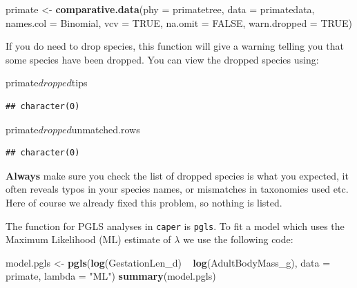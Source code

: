 \documentclass[]{book}
\newenvironment{Shaded}{\begin{snugshade}}{\end{snugshade}}
\newcommand{\KeywordTok}[1]{\textcolor[rgb]{0.13,0.29,0.53}{\textbf{{#1}}}}
\newcommand{\DataTypeTok}[1]{\textcolor[rgb]{0.13,0.29,0.53}{{#1}}}
\newcommand{\StringTok}[1]{\textcolor[rgb]{0.31,0.60,0.02}{{#1}}}
\newcommand{\OtherTok}[1]{\textcolor[rgb]{0.56,0.35,0.01}{{#1}}}
\newcommand{\NormalTok}[1]{{#1}}
\theoremstyle{definition}
\theoremstyle{definition}
\theoremstyle{definition}
\theoremstyle{remark}
\begin{document}
\begin{Shaded}
\begin{Highlighting}[]
\NormalTok{primate <-}\StringTok{ }\KeywordTok{comparative.data}\NormalTok{(}\DataTypeTok{phy =} \NormalTok{primatetree, }\DataTypeTok{data =} \NormalTok{primatedata, }
                            \DataTypeTok{names.col =} \NormalTok{Binomial, }\DataTypeTok{vcv =} \OtherTok{TRUE}\NormalTok{, }
                            \DataTypeTok{na.omit =} \OtherTok{FALSE}\NormalTok{, }\DataTypeTok{warn.dropped =} \OtherTok{TRUE}\NormalTok{)}
\end{Highlighting}
\end{Shaded}

If you do need to drop species, this function will give a warning
telling you that some species have been dropped. You can view the
dropped species using:

\begin{Shaded}
\begin{Highlighting}[]
\NormalTok{primate$dropped$tips}
\end{Highlighting}
\end{Shaded}

\begin{verbatim}
## character(0)
\end{verbatim}

\begin{Shaded}
\begin{Highlighting}[]
\NormalTok{primate$dropped$unmatched.rows}
\end{Highlighting}
\end{Shaded}

\begin{verbatim}
## character(0)
\end{verbatim}

\textbf{Always} make sure you check the list of dropped species is what
you expected, it often reveals typos in your species names, or
mismatches in taxonomies used etc. Here of course we already fixed this
problem, so nothing is listed.

The function for PGLS analyses in \texttt{caper} is \texttt{pgls}. To
fit a model which uses the Maximum Likelihood (ML) estimate of
\(\lambda\) we use the following code:

\begin{Shaded}
\begin{Highlighting}[]
\NormalTok{model.pgls <-}\StringTok{ }\KeywordTok{pgls}\NormalTok{(}\KeywordTok{log}\NormalTok{(GestationLen_d) ~}\StringTok{ }\KeywordTok{log}\NormalTok{(AdultBodyMass_g), }\DataTypeTok{data =} \NormalTok{primate, }
                   \DataTypeTok{lambda =} \StringTok{"ML"}\NormalTok{)}
\KeywordTok{summary}\NormalTok{(model.pgls)}
\end{Highlighting}
\end{Shaded}
\end{document}
